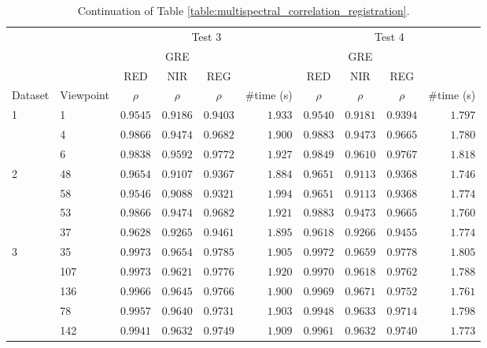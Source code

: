 \renewcommand{\arraystretch}{1.15}
\begin{table}
    \captionsetup{singlelinecheck=off}
    \caption{Continuation of Table \ref{table:multispectral_correlation_registration}.}
    \begin{tabular}{ll|cccr|cccr}
        \toprule
        \multicolumn{2}{c}{} & \multicolumn{4}{c}{Test 3} & \multicolumn{4}{c}{Test 4}\\
        \cmidrule{1-10}
        & & \multicolumn{3}{c}{GRE} & & \multicolumn{3}{c}{GRE} & \\
        & & RED & NIR & REG & & RED & NIR & REG\\
        Dataset & Viewpoint & $\rho$ & $\rho$ & $\rho$ & \#time (\si{\second}) & $\rho$ & $\rho$ & $\rho$ & \#time (\si{\second}) \\
        \cmidrule{1-10}
        \multirow{3}{*}{1} & 1 & $0.9545$ & $0.9186$ & $0.9403$ & $1.933$ & $0.9540$ & $0.9181$ & $0.9394$ & $1.797$\\
        & 4 & $0.9866$ & $0.9474$ & $0.9682$ & $1.900$ & $0.9883$ & $0.9473$ & $0.9665$ & $1.780$\\
        & 6 & $0.9838$ & $0.9592$ & $0.9772$ & $1.927$ & $0.9849$ & $0.9610$ & $0.9767$ & $1.818$\\
        \cmidrule{1-10}
        \multirow{4}{*}{2} & 48 & $0.9654$ & $0.9107$ & $0.9367$ & $1.884$ & $0.9651$ & $0.9113$ & $0.9368$ & $1.746$\\
        & 58 & $0.9546$ & $0.9088$ & $0.9321$ & $1.994$ & $0.9651$ & $0.9113$ & $0.9368$ & $1.774$\\
        & 53 & $0.9866$ & $0.9474$ & $0.9682$ & $1.921$ & $0.9883$ & $0.9473$ & $0.9665$ & $1.760$\\
        & 37 & $0.9628$ & $0.9265$ & $0.9461$ & $1.895$ & $0.9618$ & $0.9266$ & $0.9455$ & $1.774$\\
        \cmidrule{1-10}
        \multirow{8}{*}{3} & 35 & $0.9973$ & $0.9654$ & $0.9785$ & $1.905$ & $0.9972$ & $0.9659$ & $0.9778$ & $1.805$\\
        & 107 & $0.9973$ & $0.9621$ & $0.9776$ & $1.920$ & $0.9970$ & $0.9618$ & $0.9762$ & $1.788$\\
        & 136 & $0.9966$ & $0.9645$ & $0.9766$ & $1.900$ & $0.9969$ & $0.9671$ & $0.9752$ & $1.761$\\
        & 78 & $0.9957$ & $0.9640$ & $0.9731$ & $1.903$ & $0.9948$ & $0.9633$ & $0.9714$ & $1.798$\\
        & 142 & $0.9941$ & $0.9632$ & $0.9749$ & $1.909$ & $0.9961$ & $0.9632$ & $0.9740$ & $1.773$\\

\end{tabular}
\end{table}
